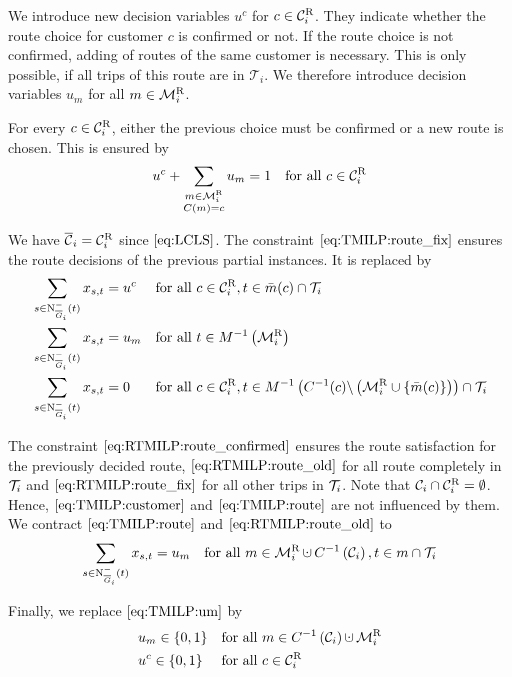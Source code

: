 We introduce new decision variables $u^c$ for $c\in\mathcal{C}^{\operatorname{R}}_i$. They indicate whether the route choice for customer $c$ is confirmed or not. If the route choice is not confirmed, adding of routes of the same customer is necessary. This is only possible, if all trips of this route are in $\mathcal{T}_i$. We therefore introduce decision variables $u_m$ for all $m\in\mathcal{M}^{\operatorname{R}}_i$.

For every $c\in\mathcal{C}^{\operatorname{R}}_i$, either the previous choice must be confirmed or a new route is chosen. This is ensured by
\begin{align}
	u^c + \sum_{\substack{m\in\mathcal{M}^{\operatorname{R}}_i \\ C(m)=c}} u_m = 1 && \text{for all } c\in\mathcal{C}^{\operatorname{R}}_i \label{eq:RTMILP:customer_old}
\end{align}

We have $\overline{\mathcal{C}}_i = \mathcal{C}^{\operatorname{R}}_i$ since $\eqref{eq:LCLS}$. The constraint $\eqref{eq:TMILP:route_fix}$ ensures the route decisions of the previous partial instances. It is replaced by
\begin{align}
	& \sum_{s\in\operatorname{N}_{\overline{G}_i}^-(t)} x_{s,t} = u^c && \text{for all } c\in\mathcal{C}^{\operatorname{R}}_i, t\in\bar{m}(c)\cap\mathcal{T}_i \label{eq:RTMILP:route_confirmed} \\
	& \sum_{s\in\operatorname{N}_{\overline{G}_i}^-(t)} x_{s,t} = u_m && \text{for all } t\in M^{-1}\left(\mathcal{M}^{\operatorname{R}}_i\right) \label{eq:RTMILP:route_old} \\
	& \sum_{s\in\operatorname{N}_{\overline{G}_i}^-(t)} x_{s,t} = 0 && \text{for all } c\in\mathcal{C}^{\operatorname{R}}_i, t\in M^{-1}\left(C^{-1}(c)\backslash\left(\mathcal{M}^{\operatorname{R}}_i\cup\left\{\bar{m}(c)\right\}\right)\right)\cap\mathcal{T}_i \label{eq:RTMILP:route_fix}
\end{align}

The constraint $\eqref{eq:RTMILP:route_confirmed}$ ensures the route satisfaction for the previously decided route, $\eqref{eq:RTMILP:route_old}$ for all route completely in $\mathcal{T}_i$ and $\eqref{eq:RTMILP:route_fix}$ for all other trips in $\mathcal{T}_i$. Note that $\mathcal{C}_i\cap\mathcal{C}^{\operatorname{R}}_i = \emptyset$. Hence, $\eqref{eq:TMILP:customer}$ and $\eqref{eq:TMILP:route}$ are not influenced by them. We contract $\eqref{eq:TMILP:route}$ and $\eqref{eq:RTMILP:route_old}$ to
\begin{align}
	\sum_{s\in\Ninoi(t)} x_{s,t} = u_m && \text{for all } m\in\MR_i\cupdot C^{-1}\left(\mathcal{C}_i\right), t\in m\cap\Ti \label{eq:RTMILP:route}
\end{align}

Finally, we replace $\eqref{eq:TMILP:um}$ by
\begin{align}
	& u_m\in\{0,1\} && \text{for all } m\in C^{-1}\left(\mathcal{C}_i\right)\cupdot\MR_i \label{eq:RTMILP:um} \\
	& u^c \in\{0,1\} && \text{for all } c\in\CR_i \label{eq:RTMILP:uc}
\end{align}

